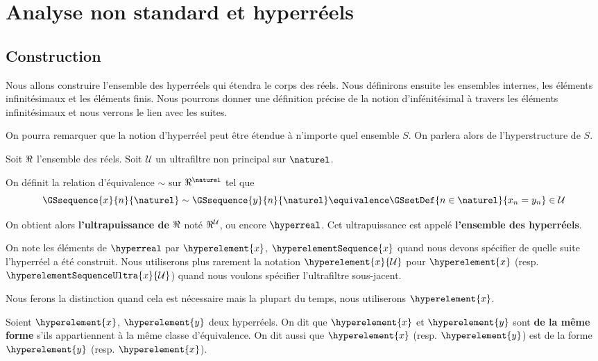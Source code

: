 \chapter{Analyse non standard et hyperréels}

\section{Construction}

Nous allons construire l'ensemble des hyperréels qui étendra le corps des réels.
Nous définirons ensuite les ensembles internes, les éléments infinitésimaux et
les éléments finis. Nous pourrons donner une définition précise de la notion
d'infénitésimal à travers les éléments infinitésimaux et nous verrons le lien
avec les suites.

On pourra remarquer que la notion d'hyperréel peut être étendue à n'importe quel
ensemble $S$. On parlera alors de l'hyperstructure de $S$.

Soit $\real$ l'ensemble des réels. Soit $\mathcal{U}$ un ultrafiltre non
principal sur $\naturel$.

On définit la relation d'équivalence $\sim$ sur $\real^{\naturel}$ tel que
\begin{equation}
	\GSsequence{x}{n}{\naturel} \sim \GSsequence{y}{n}{\naturel} \equivalence \GSsetDef{n \in \naturel}{x_{n} = y_{n}} \in \mathcal{U}
\end{equation}

On obtient alors \textbf{l'ultrapuissance de $\real$} noté $\real^{\mathcal{U}}$,
ou encore $\hyperreal$. Cet ultrapuissance est appelé \textbf{l'ensemble des
hyperréels}.

On note les éléments de $\hyperreal$ par $\hyperelement{x}$,
$\hyperelementSequence{x}$ quand nous devons spécifier de quelle suite
l'hyperréel a été construit. Nous utiliserons plus rarement la notation
$\hyperelement{x}{\mathcal{U}}$ pour $\hyperelement{x}$ (resp.
$\hyperelementSequenceUltra{x}{\mathcal{U}}$) quand nous voulons spécifier l'ultrafiltre
sous-jacent.

Nous ferons la distinction quand cela est nécessaire mais la plupart du temps,
nous utiliserons $\hyperelement{x}$.

\begin{definition} 
	Soient $\hyperelement{x}$, $\hyperelement{y}$ deux hyperréels. On dit que
	$\hyperelement{x}$ et $\hyperelement{y}$ sont \textbf{de la même forme}
	s'ils appartiennent à la même classe d'équivalence. On dit aussi que
	$\hyperelement{x}$ (resp. $\hyperelement{y}$) est de la forme
	$\hyperelement{y}$ (resp. $\hyperelement{x}$).
\end{definition}


